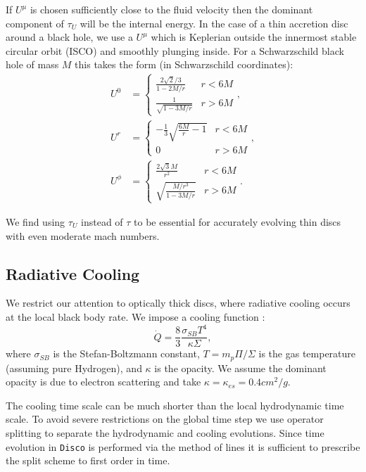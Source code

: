 \documentclass{emulateapj}
\newcommand{\sig}{\sigma}
\newcommand{\Sig}{\Sigma}
\newcommand{\ka}{\kappa}
\newcommand{\Disco}{{\texttt{Disco}}}
\begin{document}
If $U^\mu$ is chosen sufficiently close to the fluid velocity then the dominant component of $\tau_U$ will be the internal energy.  In the case of a thin accretion disc around a black hole, we use a $U^\mu$ which is Keplerian outside the innermost stable circular orbit (ISCO) and smoothly plunging inside.  For a Schwarzschild black hole of mass $M$ this takes the form (in Schwarzschild coordinates):
\begin{align}
	U^0 &= \left \{ \begin{matrix} \frac{2\sqrt{2}/3}{1-2M/r} & r < 6M \\
						\frac{1}{\sqrt{1-3M/r}} & r > 6M \end{matrix} \right . , \nonumber \\
	U^r &= \left \{ \begin{matrix} -\frac{1}{3}\sqrt{\frac{6M}{r}-1} & r < 6M \\
						0 & r > 6M \end{matrix} \right . , \nonumber \\
	U^\phi &= \left \{ \begin{matrix}  \frac{2 \sqrt{3} M}{r^2} & r < 6M \\
						\sqrt{\frac{M/r^3}{1-3M/r}} & r > 6M \end{matrix} \right . . \label{eq:Ugeo}
\end{align}

We find using $\tau_U$ instead of $\tau$ to be essential for accurately evolving thin discs with even moderate mach numbers.

\subsection{Radiative Cooling}
\label{subsec:cooling}

We restrict our attention to optically thick discs, where radiative cooling occurs at the local black body rate. We impose a cooling function \citep{Novikov73, FrankKingRaine}:
\begin{equation}
	\dot{Q} = \frac{8}{3} \frac{\sig_{SB} T^4}{\ka \Sig} , \label{eq:BBcooling}
\end{equation}
where $\sig_{SB}$ is the Stefan-Boltzmann constant, $T = m_p \Pi / \Sig$ is the gas temperature (assuming pure Hydrogen), and $\ka $ is the opacity.  We assume the dominant opacity is due to electron scattering and take $\ka = \ka_{es} = 0.4 cm^2/g$.

The cooling time scale can be much shorter than the local hydrodynamic time scale.  To avoid severe restrictions on the global time step we use operator splitting to separate the hydrodynamic and cooling evolutions.  Since time evolution in \Disco{} is performed via the method of lines it is sufficient to prescribe the split scheme to first order in time.
\end{document}
